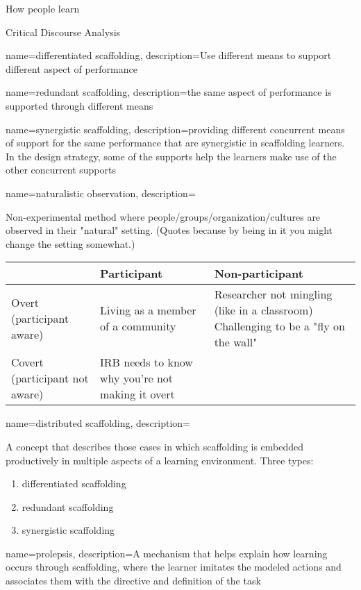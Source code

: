 {How people learn}

{Critical Discourse Analysis}

{
	name={differentiated scaffolding},
	description={Use different means to support different aspect of performance}
}

{
	name={redundant scaffolding},
	description={the same aspect of performance is supported through different means}
}

{
	name={synergistic scaffolding},
	description={providing different concurrent means of support for the same performance that are synergistic in scaffolding learners. In the design strategy, some of the supports help the learners make use of the other concurrent supports }
}
{
	name={naturalistic observation},
	description={
Non-experimental method where people/groups/organization/cultures are observed in their "natural" setting. (Quotes because by being in it you might change the setting somewhat.)


\begin{tabular}{p{1in}|p{2in}|p{2in}}
& Participant & Non-participant \\ \hline
Overt (participant aware) & 
Living as a member of a community & 
Researcher not mingling (like in a classroom) 
Challenging to be a "fly on the wall"
\\ \hline
Covert (participant not aware) & 
IRB needs to know why you're not making it overt & 
\end{tabular}
}
}

{
	name={distributed scaffolding},
	description={A concept that describes those cases in which scaffolding is embedded productively in multiple aspects of a learning environment.  \parencite{reiser_scaffolding_2014} Three types:
	\begin{enumerate}
	\item \gls{differentiated scaffolding} 
	\item \gls{redundant scaffolding} 
	\item \gls{synergistic scaffolding}
	\end{enumerate}
	}
}

{
	name={prolepsis},
	description={A mechanism that helps explain how learning occurs through scaffolding, where the learner imitates the modeled actions and associates them with the directive and definition of the task \parencite{reiser_scaffolding_2014}}
}


